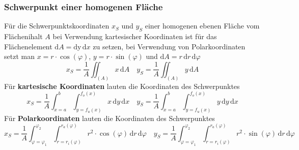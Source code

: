 \subsubsection{Schwerpunkt einer homogenen Fläche}
Für die Schwerpunktskoordinaten $x_S$ und $y_S$ einer homogenen ebenen Fläche vom Flächenihalt $A$ bei Verwendung kartesischer Koordinaten ist für das Flächenelement $\text{d}A=\text{dy}\,\text{d}x$ zu setzen, bei Verwendung von Polarkoordinaten setzt man $x=r\cdot \cos\left(\varphi\right)$, $y=r\cdot \sin\left(\varphi\right)$ und $\text{d}A=r\,\text{d}r\,\text{d}\varphi$
\begin{equation}
\boxed{x_S=\dfrac{1}{A}\displaystyle \iint_{\left(A\right)}x\,\text{d}A}\quad \boxed{y_S=\dfrac{1}{A}\displaystyle \iint_{\left(A\right)}y\,\text{d}A}
\end{equation}
Für \textbf{kartesische Koordinaten} lauten die Koordinaten des Schwerpunktes
\begin{equation}
\boxed{x_S=\dfrac{1}{A}\displaystyle \int_{x=a}^{b}\displaystyle \int_{y=f_u\left(x\right)}^{f_o\left(x\right)}x\,\text{d}y\,\text{d}x}\quad \boxed{y_S=\dfrac{1}{A}\displaystyle \int_{x=a}^{b}\displaystyle \int_{y=f_u\left(x\right)}^{f_o\left(x\right)}y\,\text{d}y\,\text{d}x}
\end{equation}
Für \textbf{Polarkoordinaten} lauten die Koordinaten des Schwerpunktes
\begin{equation}
\boxed{x_S=\dfrac{1}{A}\displaystyle \int_{\varphi=\varphi_1}^{\varphi_2}\displaystyle \int_{r=r_i\left(\varphi\right)}^{r_a\left(\varphi\right)}r^2\cdot \cos\left(\varphi\right)\,\text{d}r\,\text{d}\varphi}\quad \boxed{y_S=\dfrac{1}{A}\displaystyle \int_{\varphi=\varphi_1}^{\varphi_2}\displaystyle \int_{r=r_i\left(\varphi\right)}^{r_a\left(\varphi\right)}r^2\cdot \sin\left(\varphi\right)\,\text{d}r\,\text{d}\varphi}
\end{equation}
